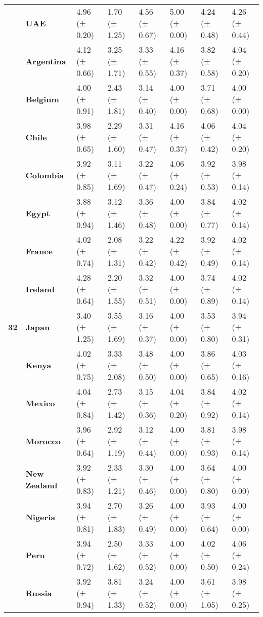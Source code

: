 \begin{longtable}{llllllll}
\textbf{} & \textbf{UAE} & 4.96 (± 0.20) & 1.70 (± 1.25) & 4.56 (± 0.67) & 5.00 (± 0.00) & 4.24 (± 0.48) & 4.26 (± 0.44) \\
\cline{1-8}
\multirow[t]{19}{*}{\textbf{32}} & \textbf{Argentina} & 4.12 (± 0.66) & 3.25 (± 1.71) & 3.33 (± 0.55) & 4.16 (± 0.37) & 3.82 (± 0.58) & 4.04 (± 0.20) \\
\textbf{} & \textbf{Belgium} & 4.00 (± 0.91) & 2.43 (± 1.81) & 3.14 (± 0.40) & 4.00 (± 0.00) & 3.71 (± 0.68) & 4.00 (± 0.00) \\
\textbf{} & \textbf{Chile} & 3.98 (± 0.65) & 2.29 (± 1.60) & 3.31 (± 0.47) & 4.16 (± 0.37) & 4.06 (± 0.42) & 4.04 (± 0.20) \\
\textbf{} & \textbf{Colombia} & 3.92 (± 0.85) & 3.11 (± 1.69) & 3.22 (± 0.47) & 4.06 (± 0.24) & 3.92 (± 0.53) & 3.98 (± 0.14) \\
\textbf{} & \textbf{Egypt} & 3.88 (± 0.94) & 3.12 (± 1.46) & 3.36 (± 0.48) & 4.00 (± 0.00) & 3.84 (± 0.77) & 4.02 (± 0.14) \\
\textbf{} & \textbf{France} & 4.02 (± 0.74) & 2.08 (± 1.31) & 3.22 (± 0.42) & 4.22 (± 0.42) & 3.92 (± 0.49) & 4.02 (± 0.14) \\
\textbf{} & \textbf{Ireland} & 4.28 (± 0.64) & 2.20 (± 1.55) & 3.32 (± 0.51) & 4.00 (± 0.00) & 3.74 (± 0.89) & 4.02 (± 0.14) \\
\textbf{} & \textbf{Japan} & 3.40 (± 1.25) & 3.55 (± 1.69) & 3.16 (± 0.37) & 4.00 (± 0.00) & 3.53 (± 0.80) & 3.94 (± 0.31) \\
\textbf{} & \textbf{Kenya} & 4.02 (± 0.75) & 3.33 (± 2.08) & 3.48 (± 0.50) & 4.00 (± 0.00) & 3.86 (± 0.65) & 4.03 (± 0.16) \\
\textbf{} & \textbf{Mexico} & 4.04 (± 0.84) & 2.73 (± 1.42) & 3.15 (± 0.36) & 4.04 (± 0.20) & 3.84 (± 0.92) & 4.02 (± 0.14) \\
\textbf{} & \textbf{Morocco} & 3.96 (± 0.64) & 2.92 (± 1.19) & 3.12 (± 0.44) & 4.00 (± 0.00) & 3.81 (± 0.93) & 3.98 (± 0.14) \\
\textbf{} & \textbf{New Zealand} & 3.92 (± 0.83) & 2.33 (± 1.21) & 3.30 (± 0.46) & 4.00 (± 0.00) & 3.64 (± 0.80) & 4.00 (± 0.00) \\
\textbf{} & \textbf{Nigeria} & 3.94 (± 0.81) & 2.70 (± 1.83) & 3.26 (± 0.49) & 4.00 (± 0.00) & 3.93 (± 0.64) & 4.00 (± 0.00) \\
\textbf{} & \textbf{Peru} & 3.94 (± 0.72) & 2.50 (± 1.62) & 3.33 (± 0.52) & 4.00 (± 0.00) & 4.02 (± 0.50) & 4.06 (± 0.24) \\
\textbf{} & \textbf{Russia} & 3.92 (± 0.94) & 3.81 (± 1.33) & 3.24 (± 0.52) & 4.00 (± 0.00) & 3.61 (± 1.05) & 3.98 (± 0.25) \\

\end{longtable}
